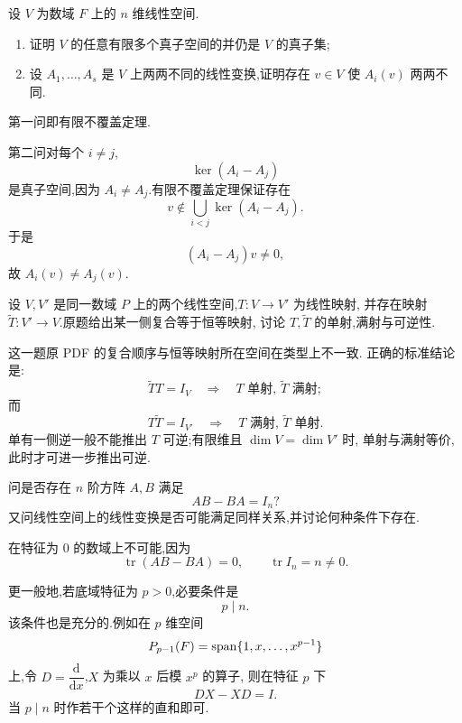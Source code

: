 \begin{example}
设 $V$ 为数域 $F$ 上的 $n$ 维线性空间.
\begin{enumerate}
    \item 证明 $V$ 的任意有限多个真子空间的并仍是 $V$ 的真子集;
    \item 设 $A_1,\ldots,A_s$ 是 $V$ 上两两不同的线性变换,证明存在
    $v\in V$ 使 $A_i(v)$ 两两不同.
\end{enumerate}
\end{example}
\exampleblank

\begin{solution}
第一问即有限不覆盖定理.

第二问对每个 $i\neq j$,
\[
\ker(A_i-A_j)
\]
是真子空间,因为 $A_i\neq A_j$.有限不覆盖定理保证存在
\[
v\notin\bigcup_{i<j}\ker(A_i-A_j).
\]
于是
\[
(A_i-A_j)v\neq0,
\]
故 $A_i(v)\neq A_j(v)$.
\end{solution}


\begin{example}[\markstar]
设 $V,V'$ 是同一数域 $P$ 上的两个线性空间,$T:V\to V'$ 为线性映射,
并存在映射 $\widetilde T:V'\to V$.原题给出某一侧复合等于恒等映射,
讨论 $T,\widetilde T$ 的单射,满射与可逆性.
\end{example}
\exampleblank

\begin{solution}
这一题原 PDF 的复合顺序与恒等映射所在空间在类型上不一致.
正确的标准结论是:
\[
\widetilde T T=I_V
\quad\Longrightarrow\quad
T\text{ 单射, }\widetilde T\text{ 满射};
\]
而
\[
T\widetilde T=I_{V'}
\quad\Longrightarrow\quad
T\text{ 满射, }\widetilde T\text{ 单射}.
\]
单有一侧逆一般不能推出 $T$ 可逆;有限维且 $\dim V=\dim V'$ 时,
单射与满射等价,此时才可进一步推出可逆.
\end{solution}


\begin{example}[\markstar]
问是否存在 $n$ 阶方阵 $A,B$ 满足
\[
AB-BA=I_n?
\]
又问线性空间上的线性变换是否可能满足同样关系,并讨论何种条件下存在.
\end{example}
\exampleblank

\begin{solution}
在特征为 $0$ 的数域上不可能,因为
\[
\operatorname{tr}(AB-BA)=0,
\qquad
\operatorname{tr}I_n=n\neq0.
\]

更一般地,若底域特征为 $p>0$,必要条件是
\[
p\mid n.
\]
该条件也是充分的.例如在 $p$ 维空间
\[
P_{p-1}(F)=\operatorname{span}\{1,x,\ldots,x^{p-1}\}
\]
上,令 $D=\dfrac{\mathrm d}{\mathrm dx}$,$X$ 为乘以 $x$ 后模 $x^p$ 的算子,
则在特征 $p$ 下
\[
DX-XD=I.
\]
当 $p\mid n$ 时作若干个这样的直和即可.
\end{solution}


